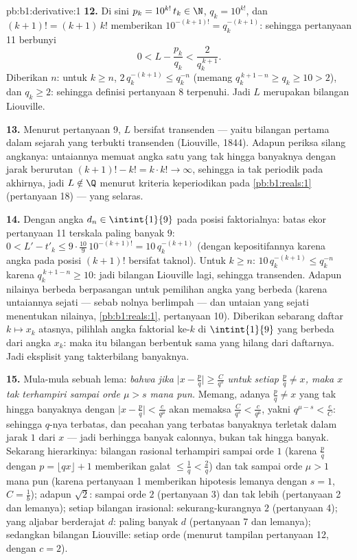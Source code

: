 \begin{solution}{pb:b1:derivative:1}
\textbf{12.} Di sini $p_k = 10^{k!}\,t_k \in \N$, $q_k = 10^{k!}$, dan
$(k+1)! = (k+1)\,k!$ memberikan $10^{-(k+1)!} = q_k^{-(k+1)}$: sehingga
pertanyaan 11 berbunyi
\[
0 < L - \frac{p_k}{q_k} < \frac{2}{q_k^{\,k+1}} .
\]
Diberikan $n$: untuk $k \geq n$, $2\,q_k^{-(k+1)} \leq q_k^{-n}$
(memang $q_k^{\,k+1-n} \geq q_k \geq 10 > 2$), dan $q_k \geq 2$:
sehingga definisi pertanyaan 8 terpenuhi. Jadi $L$ merupakan bilangan Liouville.

\textbf{13.} Menurut pertanyaan 9, $L$ bersifat transenden --- yaitu bilangan
pertama dalam sejarah yang terbukti transenden (Liouville, 1844).
Adapun periksa silang angkanya: untaiannya memuat angka satu yang tak hingga banyaknya dengan
jarak berurutan $(k+1)! - k! = k\cdot k! \to \infty$, sehingga ia
tak periodik pada akhirnya, jadi $L \notin \Q$ menurut kriteria
keperiodikan pada \cref{pb:b1:reals:1} (pertanyaan 18) --- yang selaras.

\textbf{14.} Dengan angka $d_n \in \intint{1}{9}$ pada posisi
faktorialnya: batas ekor pertanyaan 11 terskala paling banyak
$9$: $0 < L' - t'_k \leq 9\cdot\frac{10}{9}\,10^{-(k+1)!} =
10\,q_k^{-(k+1)}$ (dengan kepositifannya karena angka pada posisi
$(k+1)!$ bersifat taknol). Untuk $k \geq n$: $10\,q_k^{-(k+1)} \leq
q_k^{-n}$ karena $q_k^{\,k+1-n} \geq 10$: jadi bilangan Liouville
lagi, sehingga transenden. Adapun nilainya berbeda berpasangan
untuk pemilihan angka yang berbeda (karena untaiannya sejati ---
sebab nolnya berlimpah --- dan untaian yang sejati menentukan nilainya,
\cref{pb:b1:reals:1}, pertanyaan 10). Diberikan sebarang daftar $k \mapsto
x_k$ atasnya, pilihlah angka faktorial ke-$k$ di
$\intint{1}{9}$ yang berbeda dari angka $x_k$: maka itu bilangan berbentuk
sama yang hilang dari daftarnya. Jadi  eksplisit yang
takterbilang banyaknya.

\textbf{15.} Mula-mula sebuah lema: \emph{bahwa jika $\bigl|x - \frac pq\bigr|
\geq \frac{C}{q^s}$ untuk setiap $\frac pq \neq x$, maka $x$ tak
terhampiri sampai orde $\mu > s$ mana pun.} Memang, adanya $\frac pq \neq x$
yang tak hingga banyaknya dengan $\bigl|x - \frac pq\bigr| <
\frac{c}{q^\mu}$ akan memaksa $\frac{C}{q^s} < \frac{c}{q^\mu}$,
yakni $q^{\mu - s} < \frac cC$: sehingga $q$-nya terbatas, dan
pecahan yang terbatas banyaknya terletak dalam jarak $1$ dari $x$ ---
jadi berhingga banyak calonnya, bukan tak hingga banyak. Sekarang
hierarkinya: bilangan rasional terhampiri sampai orde $1$ (karena $\frac
pq$ dengan $p = \lfloor qx\rfloor + 1$ memberikan galat $\leq \frac1q <
\frac2q$) dan tak sampai orde $\mu > 1$ mana pun (karena pertanyaan 1 memberikan
hipotesis lemanya dengan $s = 1$, $C = \frac1b$); adapun $\sqrt2$:
sampai orde $2$ (pertanyaan 3) dan tak lebih (pertanyaan 2 dan lemanya);
setiap bilangan irasional: sekurang-kurangnya $2$ (pertanyaan 4); yang aljabar berderajat
$d$: paling banyak $d$ (pertanyaan 7 dan lemanya); sedangkan bilangan Liouville:
setiap orde (menurut tampilan pertanyaan 12, dengan $c = 2$).


\end{solution}
